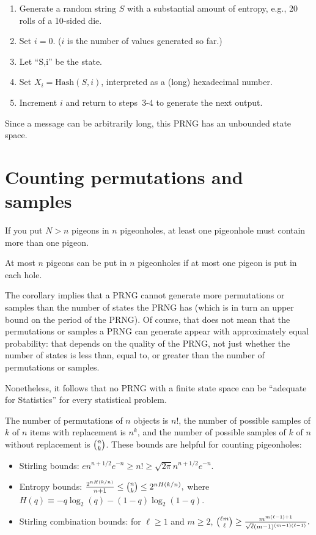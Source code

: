 \documentclass[graybox]{svmult}
\begin{document}
\begin{enumerate}
\item Generate a random string $S$ with a substantial amount of entropy, e.g., 20 rolls of a
10-sided die.
\item Set $i=0$. ($i$ is the number of values generated so far.)
\item Let ``S,i'' be the state.
\item Set $X_i = {\mbox{Hash}}(S,i)$, interpreted as a (long) hexadecimal number.
\item Increment $i$ and return to steps~3-4 to generate the next output.
\end{enumerate}

\noindent Since a message can be arbitrarily long, this PRNG has an unbounded state space.

\section{Counting permutations and samples}
\label{sec:count}

\begin{theorem}
If you put $N>n$ pigeons in $n$ pigeonholes, at least one
pigeonhole must contain more than one pigeon.
\end{theorem}

\begin{corollary}
At most $n$ pigeons can be put in $n$ pigeonholes if at most
one pigeon is put in each hole.
\end{corollary}

The corollary implies that a PRNG cannot generate more permutations or samples than the number of states the PRNG has (which is in turn an upper bound on the period of the PRNG).
Of course, that does not mean that the permutations or samples a PRNG can generate appear with approximately equal probability: that depends on the quality of the PRNG, not just whether the number of states is less than, equal to, or greater than the number of permutations or samples.

Nonetheless, it follows that no PRNG with a finite state space can be ``adequate for Statistics'' for every statistical problem.

The number of permutations of $n$ objects is $n!$, the number of possible samples of $k$ of $n$ items
with replacement is $n^k$,  and the number of possible samples of $k$ of $n$ without replacement is $\tbinom{n}{k}$.
These bounds are helpful for counting pigeonholes:
\begin{itemize}
\item Stirling bounds: $ e n^{n+1/2} e^{-n} \ge n! \ge \sqrt{2 \pi} n^{n+1/2} e^{-n}.$
\item Entropy bounds:
$ \frac{2^{nH(k/n)}}{n+1} \le \tbinom{n}{k} \le 2^{nH(k/n)},$ where $H(q) \equiv -q \log_2(q) - (1-q) \log_2 (1-q)$.
\item Stirling combination bounds:
for $\ell \ge 1$ and $m \ge 2$, $ \tbinom{\ell m}{\ell } \ge \frac{m^{m(\ell-1)+1}}{\sqrt{\ell} (m-1)^{(m-1)(\ell-1)}}. $
\end{itemize}
\end{document}
